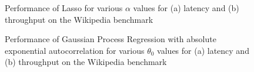 \begin{figure}
\centering
{}

\caption{Performance of Lasso for various $\alpha$ values for (a)
  latency and (b) throughput on the Wikipedia benchmark}
\label{fig:lasso_alphas}
\end{figure}

\begin{figure}
\centering
{}

\caption{Performance of Gaussian Process Regression with absolute
  exponential autocorrelation for various $\theta_0$ values for (a)
  latency and (b) throughput on the Wikipedia benchmark}
\label{fig:gp_theta0s}
\end{figure}

